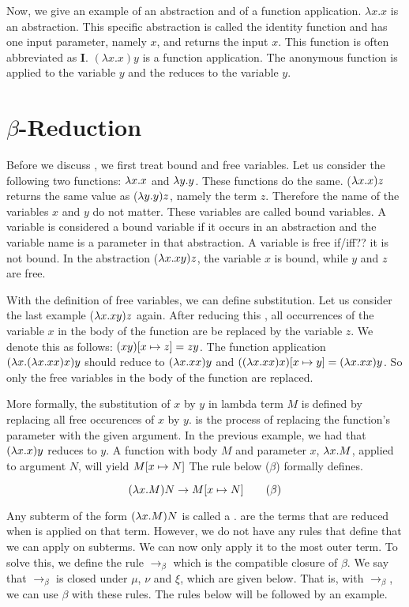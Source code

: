 Now, we give an example of an abstraction and of a function application. $\lambda x. x$ is an abstraction. This specific abstraction is called the identity function and has one input parameter, namely $x$, and returns the input $x$.
This function is often abbreviated as $\mathbf{I}$. $(\lambda x. x) y$ is a function application. The anonymous function is applied to the variable $y$ and the \lterm reduces to the variable $y$.

\section{\texorpdfstring{\boldmath${\beta}$-Reduction}{Beta Reduction}}
Before we discuss \br, we first treat bound and free variables. Let us consider the following two functions: $\lambda x. x$ and $\lambda y. y$. These functions do the same.
($\lambda x. x) z$ returns the same value as ($\lambda y.y) z$, namely the term $z$. Therefore the name of the variables $x$ and $y$ do not matter. These variables are called bound variables.
A variable is considered a bound variable if it occurs in an abstraction and the variable name is a parameter in that abstraction. A variable is free if/iff?? it is not bound.
In the abstraction ($\lambda x. xy) z$, the variable $x$ is bound, while $y$ and $z$ are free.

With the definition of free variables, we can define substitution. Let us consider the last example ($\lambda x. xy) z$ again. After reducing this \lterm, all occurrences of the variable $x$ in the body of the function are be replaced by the variable $z$.
We denote this as follows: $(xy) [{x}\mapsto{z}] = zy$. The function application $(\lambda x. (\lambda x. x x) x)y$ should reduce to $(\lambda x. x x) y$ and $((\lambda x. x x) x) [{x}\mapsto{y}] = (\lambda x. x x) y$. So only the free variables in the body of the function are replaced.

More formally, the substitution of $x$ by $y$ in lambda term $M$ is defined by replacing all free occurences of $x$ by $y$.
\br is the process of replacing the function's parameter with the given argument. In the previous example, we had that $(\lambda x. x)y$ reduces to $y$.
A function with body $M$ and parameter $x$, $\lambda x. M$, applied to argument $N$, will yield $M [{x}\mapsto{N}]$
The rule below ($\beta$) formally defines. \br

\vspace{10pt}
\[
	(\lambda x. M)N \rightarrow M [{x}\mapsto{N}] \quad \quad (\beta)
\]

\vspace{10pt}
Any subterm of the form $(\lambda x. M) N$ is called a \bre. \bres are the terms that are reduced when \br is applied on that term.
However, we do not have any rules that define that we can apply \br on subterms. We can now only apply it to the most outer term.
To solve this, we define the rule $\rightarrow_\beta$ which is the compatible closure of $\beta$.
We say that $\rightarrow_\beta$ is closed under $\mu$, $\nu$ and $\xi$, which are given below. That is, with $\rightarrow_\beta$, we can use $\beta$ with these rules.
The rules below will be followed by an example.

